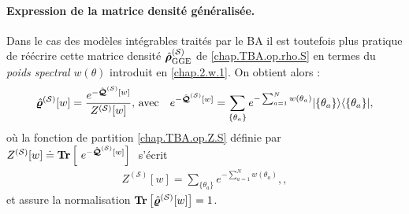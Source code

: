 \paragraph{Expression de la matrice densité généralisée.}
Dans le cas des modèles intégrables traités par le \gls{BA} il est toutefois plus pratique de réécrire cette matrice densité  $\hat{\bm{\rho}}^{(\mathcal{S})}_{\mathrm{GGE}}$ de \eqref{chap.TBA.op.rho.S} en termes du \emph{poids spectral} $w(\theta)$ introduit en \eqref{chap.2.w.1}. On obtient alors :
\begin{eqnarray}\label{chap.2.densite.1}
	\hat{\bm{\varrho}}^{(\mathcal{S})}[w]  =  \frac{e^{-\hat{\bm{\mathcal{Q}}}^{(\mathcal{S})}[w]}}{Z^{(\mathcal{S})}[w]}, \, \mbox{avec} \quad e^{-\hat{\bm{\mathcal{Q}}}^{(\mathcal{S})}[w]}  = 	\sum_{\{\theta_a \}} e^{- \sum_{a = 1}^N w(\theta_a) } \vert \{ \theta_a\} \rangle \langle  \{ \theta_a\}  \vert, 
\end{eqnarray}	
où la fonction de partition \eqref{chap.TBA.op.Z.S} définie par $Z^{(\mathcal{S})}[w]\doteq \bm{\mathrm{Tr}}\left [ e^{-\operator{\mathcal{Q}}^{(\mathcal{S})}[w]}\right ] $ s'écrit 
\begin{eqnarray}
	Z^{(\mathcal{S})}[w]   =  \sum_{\{\theta_a \}} e^{-\sum_{a = 1}^N w(\theta_a)},\label{chap.TBA.op.Z.S.1},	
\end{eqnarray}
et assure la normalisation $\bm{\mathrm{Tr}} \left [ \hat{\bm{\varrho}}^{(\mathcal{S})}[w] \right ] = 1$.


